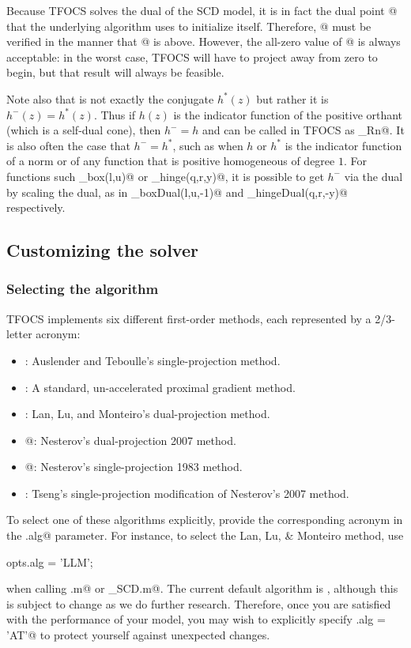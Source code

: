 \documentclass{article}
\newcommand{\<}{\langle}
\renewcommand{\>}{\rangle}
\begin{document}
Because TFOCS solves the dual of the SCD model, it is in fact the dual point
@ that the underlying algorithm uses to initialize itself. Therefore,
@ must be verified in the manner that @ is above. However,
the all-zero value of @ is always acceptable:
in the worst case, TFOCS will have to project away from zero to begin,
but that result will always be feasible.

Note also that \verb@conjnegF@ is not exactly the conjugate $h^*(z)$ but rather
it is $h^{-}(z) = h^*(z)$. Thus if $h(z)$ is the indicator function of the positive
orthant (which is a self-dual cone), then $h^{-}=h$ and can be called
in TFOCS as \verb@proj_Rn@.  It is also often the case that $h^{-} = h^*$,
such as when $h$ or $h^*$ is the indicator function of a norm or of any function
that is positive homogeneous of degree $1$. For functions such \verb@proj_box(l,u)@
or \verb@prox_hinge(q,r,y)@, it is possible to get $h^{-}$ via the dual by scaling
the dual, as in \verb@prox_boxDual(l,u,-1)@ and \verb@prox_hingeDual(q,r,-y)@ respectively.

\subsection{Customizing the solver}

\subsubsection{Selecting the algorithm}

TFOCS implements six different first-order methods, 
each represented by a 2/3-letter acronym:
\begin{itemize}
\itemsep 0pt
\item \verb@AT@: Auslender and Teboulle's single-projection method.
\item \verb@GRA@: A standard, un-accelerated proximal gradient method.
\item \verb@LLM@: Lan, Lu, and Monteiro's dual-projection method.
\item {}@: Nesterov's dual-projection 2007 method.
\item {}@: Nesterov's single-projection 1983 method.
\item \verb@TS@: Tseng's single-projection modification of Nesterov's 2007 method.
\end{itemize}
To select one of these algorithms explicitly, provide the corresponding
acronym in the \verb@opts.alg@ parameter. For instance,
to select the Lan, Lu, \& Monteiro method, use
\begin{code}
	opts.alg = 'LLM';
\end{code}
when calling  \verb@tfocs.m@ or \verb@tfocs_SCD.m@. The current default
algorithm is \verb@AT@, although this is subject to change as we do
further research. Therefore, once you are satisfied with the performance
of your model, you may wish to explicitly specify \verb@opts.alg = 'AT'@
to protect yourself against unexpected changes.
\end{document}

